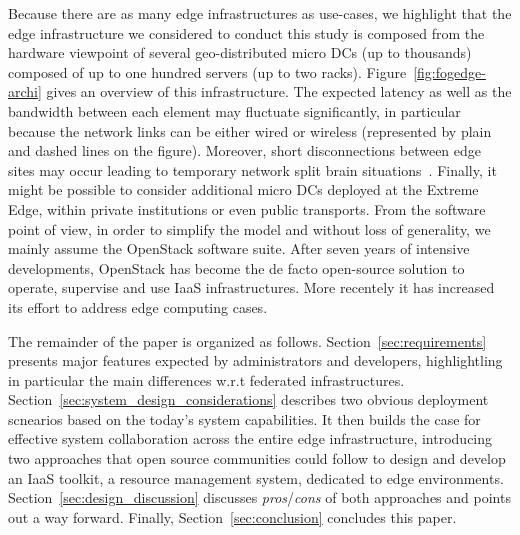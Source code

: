 Because there are as many edge infrastructures as use-cases, we
highlight that the edge infrastructure we considered to conduct this
study is composed from the hardware viewpoint of several
geo-distributed micro DCs (up to thousands)
composed of up to one hundred servers (up to two racks).
Figure~\ref{fig:fogedge-archi} gives an overview of this
infrastructure. The expected latency as well as the bandwidth between
each element may fluctuate significantly, in particular because the
network links can be either wired or wireless (represented by plain
and dashed lines on the figure). Moreover, short disconnections
between edge sites may occur leading to temporary network split brain
situations~\cite{4456903}. Finally, it might be possible
to consider additional micro DCs deployed at the Extreme Edge, within
private institutions or even public transports.
%
From the software point of view, in order to simplify the model and
without loss of generality, we mainly assume the OpenStack software
suite.  After seven years of intensive developments, OpenStack has
become the de facto open-source solution to operate, supervise and use
IaaS infrastructures. More recentely it has increased its effort to address edge computing cases.


The remainder of the paper is organized as
follows. Section~\ref{sec:requirements} presents major features
expected by administrators and developers, highlightling in particular
the main differences w.r.t federated infrastructures.
Section~\ref{sec:system_design_considerations} describes two obvious deployment scnearios based on the today's system capabilities. It then builds the case for effective system collaboration across the entire edge infrastructure, introducing two approaches that
open source communities could follow to design and develop an IaaS
toolkit, \aka a resource management system, dedicated to edge
environments. Section~\ref{sec:design_discussion} discusses \emph{pros}/\emph{cons}
of both approaches and points out a way forward. Finally,
Section~\ref{sec:conclusion} concludes this paper.


